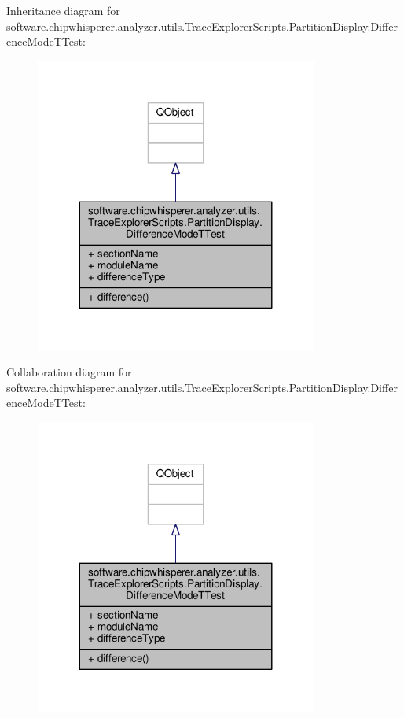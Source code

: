Inheritance diagram for software.\+chipwhisperer.\+analyzer.\+utils.\+Trace\+Explorer\+Scripts.\+Partition\+Display.\+Difference\+Mode\+T\+Test\+:\nopagebreak
\begin{figure}[H]
\begin{center}
\leavevmode
\includegraphics[width=263pt]{d4/d0c/classsoftware_1_1chipwhisperer_1_1analyzer_1_1utils_1_1TraceExplorerScripts_1_1PartitionDisplay_065b9381a122d2badf0ccd3011599189}
\end{center}
\end{figure}


Collaboration diagram for software.\+chipwhisperer.\+analyzer.\+utils.\+Trace\+Explorer\+Scripts.\+Partition\+Display.\+Difference\+Mode\+T\+Test\+:\nopagebreak
\begin{figure}[H]
\begin{center}
\leavevmode
\includegraphics[width=263pt]{df/dbe/classsoftware_1_1chipwhisperer_1_1analyzer_1_1utils_1_1TraceExplorerScripts_1_1PartitionDisplay_964cbfeae2ab455dab90b103aeae00de}
\end{center}
\end{figure}


